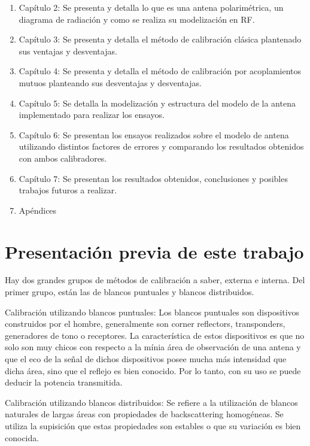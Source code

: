 \begin{enumerate}
	\item Capítulo 2: Se presenta y detalla lo que es una antena polarimétrica, un diagrama de radiación y como se realiza su 
		modelización en RF.
	\item Capítulo 3: Se presenta y detalla el método de calibración clásica plantenado sus ventajas y desventajas.
	\item Capítulo 4: Se presenta y detalla el método de calibración por acoplamientos mutuos planteando sus desventajas y 
		desventajas.
	\item Capítulo 5: Se detalla la modelización y estructura del modelo de la antena implementado para realizar los ensayos.
	\item Capítulo 6: Se presentan los ensayos realizados sobre el modelo de antena utilizando distintos factores de errores y 
		comparando los resultados obtenidos con ambos calibradores.
	\item Capítulo 7: Se presentan los resultados obtenidos, conclusiones y posibles trabajos futuros a realizar.
	\item Apéndices
\end{enumerate}


\section{Presentación previa de este trabajo}

Hay dos grandes grupos de métodos de calibración a saber, externa e interna. Del primer grupo, están las de blancos 
puntuales y blancos distribuidos.

Calibración utilizando blancos puntuales: Los blancos puntuales son dispositivos construidos por el hombre, generalmente son
corner reflectors, transponders, generadores de tono o receptores. La característica de estos dispositivos es que no solo 
son muy chicos con respecto a la mínia área de observación de una antena y que el eco de la señal de dichos dispositivos 
posee mucha más intensidad que dicha área, sino que el reflejo es bien conocido. Por lo tanto, con su uso se puede deducir la potencia transmitida.

Calibración utilizando blancos distribuidos: Se refiere a la utilización de blancos naturales de largas áreas con 
propiedades de backscattering homogéneas. Se utiliza la supisición que estas propiedades son estables o que su variación es 
bien conocida.

